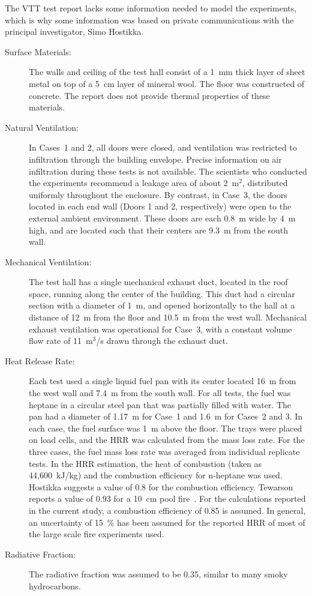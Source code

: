 The VTT test report lacks some information needed to model the experiments, which is why some information was based on private communications with the
principal investigator, Simo Hostikka.
\begin{description}
\item[Surface Materials:] The walls and ceiling of the test hall consist of a 1~mm thick layer of sheet metal on top of a 5~cm layer of mineral wool. The floor was constructed of concrete. The report does not provide thermal properties of these materials.
\item[Natural Ventilation:] In Cases~1 and 2, all doors were closed, and ventilation was restricted to infiltration through the building envelope. Precise information on air infiltration during these tests is not available. The scientists who conducted the experiments recommend a leakage area of about 2~m$^2$, distributed uniformly throughout the enclosure. By contrast, in Case~3, the doors located in each end wall (Doors 1 and 2, respectively) were open to the external ambient environment. These doors are each 0.8~m wide by 4~m high, and are located such that their centers are 9.3~m from the south wall.
\item[Mechanical Ventilation:] The test hall has a single mechanical exhaust duct, located in the roof space, running along the center of the building. This duct had a circular section with a diameter of 1~m, and opened horizontally to the hall at a distance of 12~m from the floor and 10.5~m from the west wall. Mechanical exhaust ventilation was operational for Case~3, with a constant volume flow rate of 11~m$^3$/s drawn through the exhaust duct.
\item[Heat Release Rate:] Each test used a single liquid fuel pan with its center located 16~m from the west wall and 7.4~m from the south wall. For all tests, the fuel was heptane in a circular steel pan that was partially filled with water. The pan had a diameter of 1.17~m for Case~1 and 1.6~m for Cases~2 and 3. In each case, the fuel surface was 1~m above the floor. The trays were placed on load cells, and the HRR was calculated from the mass loss rate. For the three cases, the fuel mass loss rate was averaged from individual replicate tests. In the HRR estimation, the heat of combustion (taken as 44,600~kJ/kg) and the combustion efficiency for n-heptane was used. Hostikka suggests a value of 0.8 for the combustion efficiency. Tewarson reports a value of 0.93 for a 10~cm pool fire~\cite{SFPE:Tewarson}. For the calculations reported in the current study, a combustion efficiency of 0.85 is assumed. In general, an uncertainty of 15~\% has been assumed for the reported HRR of most of the large scale fire experiments used.
\item[Radiative Fraction:] The radiative fraction was assumed to be 0.35, similar to many smoky hydrocarbons.
\end{description}
